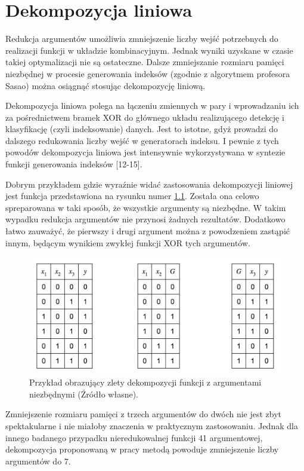\chapter{Dekompozycja liniowa}

Redukcja argumentów umożliwia zmniejszenie liczby wejść potrzebnych do realizacji funkcji w układzie kombinacyjnym.
Jednak wyniki uzyskane w czasie takiej optymalizacji nie są ostateczne.
Dalsze zmniejszanie rozmiaru pamięci niezbędnej w procesie generowania indeksów (zgodnie z algorytmem profesora Sasao) można osiągnąć stosując dekompozycję liniową.

Dekompozycja liniowa polega na  łączeniu zmiennych w pary i wprowadzaniu ich za pośrednictwem bramek XOR do głównego układu realizującego detekcję i klasyfikację (czyli indeksowanie) danych.
Jest to istotne,
gdyż prowadzi do dalszego redukowania liczby wejść w generatorach indeksu.
I pewnie z tych powodów dekompozycja liniowa jest intensywnie wykorzystywana w syntezie funkcji generowania indeksów [12-15].

Dobrym przykładem gdzie wyraźnie widać zastosowania dekompozycji liniowej jest funkcja przedstawiona na rysunku numer \ref{fig:required-decomposition}.
Została ona celowo spreparowana w taki sposób,
że wszystkie argumenty są niezbędne.
W takim wypadku redukcja argumentów nie przynosi żadnych rezultatów.
Dodatkowo łatwo zauważyć,
że pierwszy i drugi argument można z powodzeniem zastąpić innym,
będącym wynikiem zwykłej funkcji XOR tych argumentów.

\begin{figure}[H]
\centering
\includegraphics[width = 13cm]{chapter03/required-decomposition.png}
\caption{Przykład obrazujący zlety dekompozycji funkcji z argumentami niezbędnymi (Źródło własne).}
\label{fig:required-decomposition}
\end{figure}

Zmniejszenie rozmiaru pamięci z trzech argumentów do dwóch nie jest zbyt spektakularne i nie miałoby znaczenia w praktycznym zastosowaniu.
Jednak dla innego badanego przypadku nieredukowalnej funkcji 41 argumentowej,
dekompozycja proponowaną w pracy metodą powoduje zmniejszenie liczby argumentów do 7.

